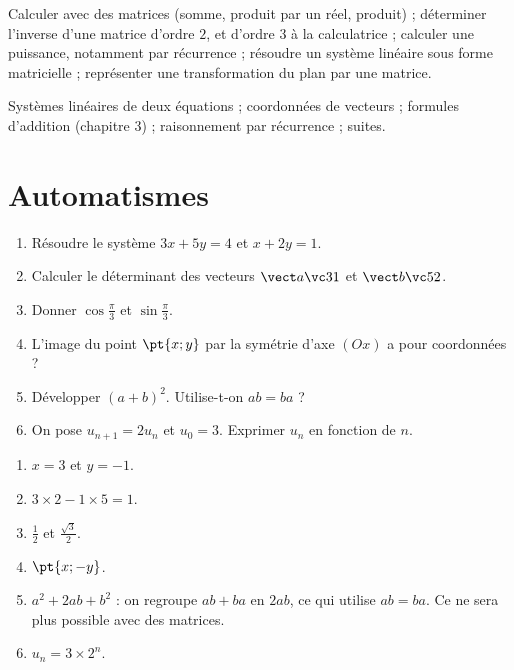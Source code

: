
\begin{objectives}
Calculer avec des matrices (somme, produit par un réel, produit) ; déterminer l'inverse d'une matrice d'ordre $2$, et d'ordre $3$ à la calculatrice ; calculer une puissance, notamment par récurrence ; résoudre un système linéaire sous forme matricielle ; représenter une transformation du plan par une matrice.
\end{objectives}
\begin{prerequisites}
Systèmes linéaires de deux équations ; coordonnées de vecteurs ; formules d'addition (chapitre 3) ; raisonnement par récurrence ; suites.
\end{prerequisites}

\section{Automatismes}
\begin{fluency}
\begin{enumerate}
\item Résoudre le système $3x+5y=4$ et $x+2y=1$.
\item Calculer le déterminant des vecteurs $\vect a\vc31$ et $\vect b\vc52$.
\item Donner $\cos\frac\pi3$ et $\sin\frac\pi3$.
\item L'image du point $\pt{x;y}$ par la symétrie d'axe $(Ox)$ a pour coordonnées ?
\item Développer $(a+b)^2$. Utilise-t-on $ab=ba$ ?
\item On pose $u_{n+1}=2u_n$ et $u_0=3$. Exprimer $u_n$ en fonction de $n$.
\end{enumerate}
\end{fluency}
\begin{solution}[Automatismes]
\begin{enumerate}
\item $x=3$ et $y=-1$.
\item $3\times2-1\times5=1$.
\item $\frac12$ et $\frac{\sqrt3}2$.
\item $\pt{x;-y}$.
\item $a^2+2ab+b^2$ : on regroupe $ab+ba$ en $2ab$, ce qui utilise $ab=ba$. Ce ne sera plus possible avec des matrices.
\item $u_n=3\times2^n$.
\end{enumerate}
\end{solution}

